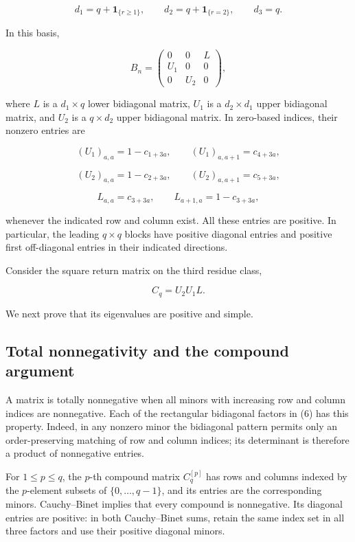 \documentclass[11pt,a4paper]{article}
\begin{document}
\[
d_1=q+\mathbf1_{\{r\geq1\}},\qquad
d_2=q+\mathbf1_{\{r=2\}},\qquad d_3=q.
\]

In this basis,

\[
B_n=
\begin{pmatrix}
0&0&L\\
U_1&0&0\\
0&U_2&0
\end{pmatrix},
\tag{5}
\]

where \(L\) is a \(d_1\times q\) lower bidiagonal matrix, \(U_1\) is a
\(d_2\times d_1\) upper bidiagonal matrix, and \(U_2\) is a
\(q\times d_2\) upper bidiagonal matrix. In zero-based indices, their
nonzero entries are

\[
(U_1)_{a,a}=1-c_{1+3a},\qquad
(U_1)_{a,a+1}=c_{4+3a},
\]

\[
(U_2)_{a,a}=1-c_{2+3a},\qquad
(U_2)_{a,a+1}=c_{5+3a},
\]

\[
L_{a,a}=c_{3+3a},\qquad
L_{a+1,a}=1-c_{3+3a},
\]

whenever the indicated row and column exist. All these entries are
positive. In particular, the leading \(q\times q\) blocks have positive
diagonal entries and positive first off-diagonal entries in their
indicated directions.

Consider the square return matrix on the third residue class,

\[
C_q=U_2U_1L.
\tag{6}
\]

We next prove that its eigenvalues are positive and simple.

\hypertarget{1032-total-nonnegativity-and-the-compound-argument}{%
\subsection{Total nonnegativity and the compound
argument}\label{1032-total-nonnegativity-and-the-compound-argument}}

A matrix is totally nonnegative when all minors with increasing row and
column indices are nonnegative. Each of the rectangular bidiagonal
factors in (6) has this property. Indeed, in any nonzero minor the
bidiagonal pattern permits only an order-preserving matching of row and
column indices; its determinant is therefore a product of nonnegative
entries.

For \(1\leq p\leq q\), the \(p\)-th compound matrix \(C_q^{[p]}\) has
rows and columns indexed by the \(p\)-element subsets of
\(\{0,\ldots,q-1\}\), and its entries are the corresponding minors.
Cauchy--Binet implies that every compound is nonnegative. Its diagonal
entries are positive: in both Cauchy--Binet sums, retain the same index
set in all three factors and use their positive diagonal minors.
\end{document}

